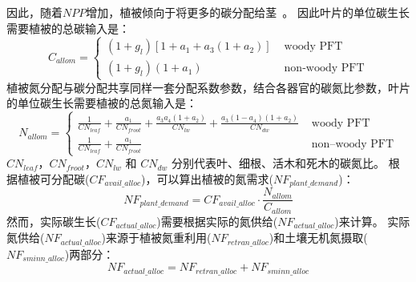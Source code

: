 因此，随着$NPP$增加，植被倾向于将更多的碳分配给茎~\citep{allen2005,vanninen2005carbon}。
因此叶片的单位碳生长需要植被的总碳输入是：
\begin{equation}\label{C_allom}
C_{allom }=\begin{cases}
\left(1+g_{l}\right)\left[1+a_{1}+a_{3}\left(1+a_{2}\right)\right] &  \text{ woody PFT} \\ 
\left(1+g_{l}\right)\left(1+a_{1}\right)  &  \text{ non-woody PFT}
\end{cases}
\end{equation}
植被氮分配与碳分配共享同样一套分配系数参数，结合各器官的碳氮比参数，叶片的单位碳生长需要植被的总氮输入是：
\begin{equation}\label{N_allom}
N_{ {allom }}= \begin{cases}
\frac{1}{CN_{ {leaf }}}+\frac{a_{1}}{CN_{ {froot }}}+\frac{a_{3} a_{4}\left(1+a_{2}\right)}
  {CN_{l w}}+\frac{a_{3}\left(1-a_{4}\right)\left(1+a_{2}\right)}{CN_{d w}}  &  \text { woody PFT} \\ 
  \frac{1}{CN_{ {leaf }}}+\frac{a_{1}}{CN_{ {froot }}} & \text { non--woody PFT}
  \end{cases}
 \end{equation}
$CN_{leaf}$，$CN_{froot}$，$CN_{lw}$ 和 $CN_{dw}$ 分别代表叶、细根、活木和死木的碳氮比。
根据植被可分配碳($CF_{avail\_{alloc}}$)，可以算出植被的氮需求($NF_{plant\_{demand}}$)：
\begin{equation}
N F_{ {plant\_{demand }}}=CF_{ {avail\_{alloc }}} \cdot \frac{N_{ {allom }}}{C_{ {allom }}}
\end{equation}
然而，实际碳生长($CF_{actual\_{alloc}}$)需要根据实际的氮供给($NF_{actual\_{alloc}}$)来计算。
实际氮供给($NF_{actual\_{alloc}}$)来源于植被氮重利用($NF_{retran\_{alloc}}$)和土壤无机氮摄取($NF_{sminn\_{alloc}}$)两部分：
\begin{equation}\label{NF_actual_alloc}
NF_{actual\_{alloc}}=NF_{retran\_{alloc}}+NF_{sminn\_{alloc}}
\end{equation}


